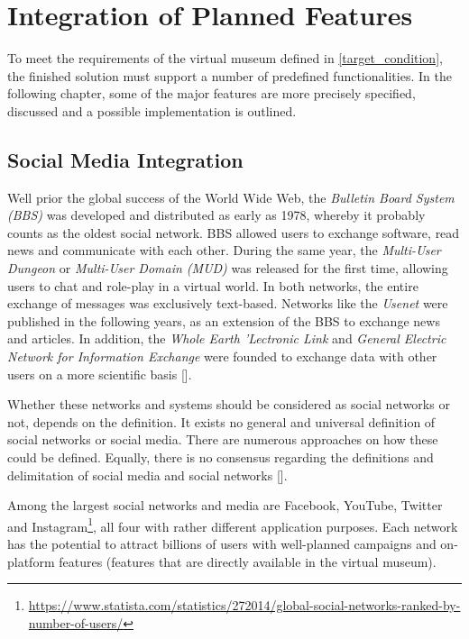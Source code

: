 \chapter{Integration of Planned Features}
\label{cha:Integration of Planned Features}

To meet the requirements of the virtual museum defined in \ref{target_condition}, the finished solution must support a number of predefined functionalities. In the following chapter, some of the major features are more precisely specified, discussed and a possible implementation is outlined.

\section{Social Media Integration} \label{cha:Social Media Integration}

Well prior the global success of the World Wide Web, the \emph{Bulletin Board System (BBS)} was developed and distributed as early as 1978, whereby it probably counts as the oldest social network. BBS allowed users to exchange software, read news and communicate with each other. During the same year, the \emph{Multi-User Dungeon} or \emph{Multi-User Domain (MUD)} was released for the first time, allowing users to chat and role-play in a virtual world. In both networks, the entire exchange of messages was exclusively text-based. Networks like the \emph{Usenet} were published in the following years, as an extension of the BBS to exchange news and articles. In addition, the \emph{Whole Earth 'Lectronic Link} and \emph{General Electric Network for Information Exchange} were founded to exchange data with other users on a more scientific basis [\cite[pp. 3--4]{historySocialMedia}].

Whether these networks and systems should be considered as social networks or not, depends on the definition. It exists no general and universal definition of social networks or social media. There are numerous approaches on how these could be defined. Equally, there is no consensus regarding the definitions and delimitation of social media and social networks [\cite[3]{socialMediaAndBusiness}].

Among the largest social networks and media are Facebook, YouTube, Twitter and Instagram\footnote{\url{https://www.statista.com/statistics/272014/global-social-networks-ranked-by-number-of-users/}}, all four with rather different application purposes. Each network has the potential to attract billions of users with well-planned campaigns and on-platform features (features that are directly available in the virtual museum).

